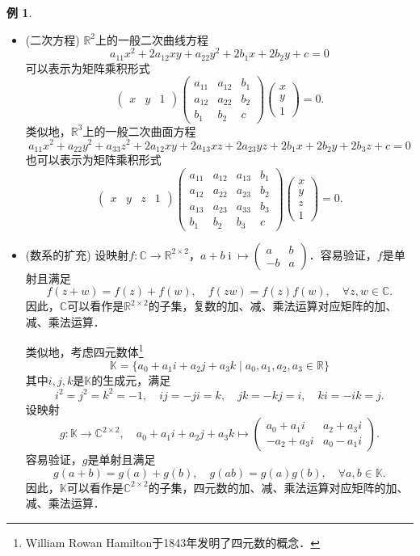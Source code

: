 \documentclass[a4paper,fontset=windows]{ctexbook}
\theoremstyle{definition}
\newtheorem{example}{例}[chapter]
\DeclareMathOperator{\I}{i}
\begin{document}
\begin{example}
\begin{itemize}
\item{\rm(二次方程)} $\mathbb{R}^2$上的一般二次曲线方程
$$a_{11}x^2+2a_{12}xy+a_{22}y^2+2b_1x+2b_2y+c=0$$
可以表示为矩阵乘积形式
$$\begin{pmatrix}x&y&1\end{pmatrix}\begin{pmatrix}a_{11}&a_{12}&b_1 \\ a_{12}&a_{22}&b_2 \\ b_1&b_2&c\end{pmatrix}\begin{pmatrix}x \\ y \\ 1\end{pmatrix}=0.$$
类似地，$\mathbb{R}^3$上的一般二次曲面方程
$$a_{11}x^2+a_{22}y^2+a_{33}z^2+2a_{12}xy+2a_{13}xz+2a_{23}yz+2b_1x+2b_2y+2b_3z+c=0$$
也可以表示为矩阵乘积形式
$$\begin{pmatrix}x&y&z&1\end{pmatrix}\begin{pmatrix}a_{11}&a_{12}&a_{13}&b_1 \\ a_{12}&a_{22}&a_{23}&b_2 \\ a_{13}&a_{23}&a_{33}&b_3 \\ b_1&b_2&b_3&c\end{pmatrix}\begin{pmatrix}x \\ y \\ z \\ 1\end{pmatrix}=0.$$

\item{\rm(数系的扩充)} 设映射$f:\mathbb{C}\to\mathbb{R}^{2\times 2}$，$a+b\I\mapsto\begin{pmatrix}a&b \\ -b&a\end{pmatrix}$．容易验证，$f$是单射且满足
$$f(z+w)=f(z)+f(w),\quad f(zw)=f(z)f(w),\quad\forall z,w\in\mathbb{C}.$$
因此，$\mathbb{C}$可以看作是$\mathbb{R}^{2\times 2}$的子集，复数的加、减、乘法运算对应矩阵的加、减、乘法运算．

类似地，考虑四元数体\footnote{William Rowan Hamilton于1843年发明了四元数的概念．}
$$\mathbb{K}=\{a_0+a_1i+a_2j+a_3k\mid a_0,a_1,a_2,a_3\in\mathbb{R}\}$$
其中$i,j,k$是$\mathbb{K}$的生成元，满足
$$i^2=j^2=k^2=-1,\quad ij=-ji=k,\quad jk=-kj=i,\quad ki=-ik=j.$$
设映射
$$g:\mathbb{K}\to\mathbb{C}^{2\times 2},\quad a_0+a_1i+a_2j+a_3k\mapsto\begin{pmatrix}a_0+a_1i&a_2+a_3i \\ -a_2+a_3i&a_0-a_1i\end{pmatrix}.$$
容易验证，$g$是单射且满足
\begin{equation}\label{eq2.2}
g(a+b)=g(a)+g(b),\quad g(ab)=g(a)g(b),\quad\forall a,b\in\mathbb{K}.
\end{equation}
因此，$\mathbb{K}$可以看作是$\mathbb{C}^{2\times 2}$的子集，四元数的加、减、乘法运算对应矩阵的加、减、乘法运算．


\end{itemize}
\end{example}
\end{document}
